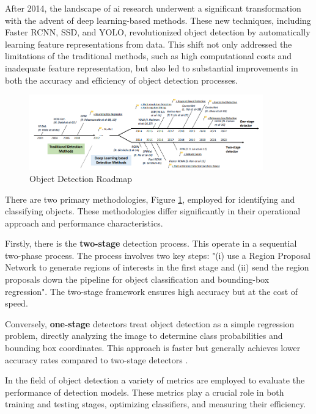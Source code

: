 After 2014, the landscape of \ac{ai} research underwent a significant transformation with the advent of deep learning-based methods. These new techniques, including Faster RCNN, SSD, and YOLO, revolutionized object detection by automatically learning feature representations from data. This shift not only addressed the limitations of the traditional methods, such as high computational costs and inadequate feature representation, but also led to substantial improvements in both the accuracy and efficiency of object detection processes.

\begin{figure}[h]
    \centering 
    \includegraphics[width=0.9\textwidth]{figs/roadmap-stage.png} 
    \caption{Object Detection Roadmap~\cite{rfc22}}
    \label{fig:stage-detectors}
\end{figure}

There are two primary methodologies, Figure \ref{fig:stage-detectors}, employed for identifying and classifying objects. These methodologies differ significantly in their operational approach and performance characteristics.

Firstly, there is the \textbf{two-stage} detection process. This operate in a sequential two-phase process. The process involves two key steps: "(i) use a Region Proposal Network to generate regions of interests in the first stage and (ii) send the region proposals down the pipeline for object classification and bounding-box regression"\cite{rfc21}. The two-stage framework ensures high accuracy but at the cost of speed.

Conversely, \textbf{one-stage} detectors treat object detection as a simple regression problem, directly analyzing the image to determine class probabilities and bounding box coordinates. This approach is faster but generally achieves lower accuracy rates compared to two-stage detectors \cite{rfc23}.

In the field of object detection a variety of metrics are employed to evaluate the performance of detection models. These metrics play a crucial role in both training and testing stages, optimizing classifiers, and measuring their efficiency. 

